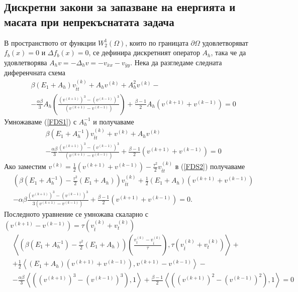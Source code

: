 \documentclass{article}
\newcommand{\rf}[1]{(\ref{#1})}
\theoremstyle{remark}
\begin{document}
\subsection{Дискретни закони за запазване на енергията и масата при непрекъснатата задача}
В пространството от функции $W^1_2(\Omega)$, които по границата $\partial\Omega$ удовлетворяват $f_b(x) = 0$ и $\Delta f_b(x) = 0$, се дефинира дискретният оператор $A_h$, така че да удовлетворява $A_h v=-\Delta_h v=-v_{\bar{x}x} - v_{\bar{y}y}$. Нека да разгледаме следната диференчната схема
\begin{align}\label{FDS1}
&\beta (E_1+A_h)v_{\bar{t}t}^{(k)} + A_hv^{(k)}+A_h^2 v^{(k)} -\nonumber\\
&-\frac{\alpha \beta}{3} A_h\left(\frac{(v^{(k+1)})^3-(v^{(k-1)})^3}{(v^{(k+1)}-v^{(k-1)})} \right) + \frac{\beta - 1}{2}A_h\left( v^{(k+1)}+v^{(k-1)} \right) =0
\end{align}
Умножаваме \rf{FDS1} с $A_h^{-1}$ и получаваме
\begin{align}\label{FDS2}
&\beta (E_1+A_h^{-1})v_{\bar{t}t}^{(k)} + v^{(k)}+A_h v^{(k)} \nonumber\\
&-\frac{\alpha \beta}{3} \frac{(v^{(k+1)})^3-(v^{(k-1)})^3}{(v^{(k+1)}-v^{(k-1)})} + \frac{\beta - 1}{2}\left( v^{(k+1)} + v^{(k-1)} \right)= 0
\end{align}
Ако заместим $v^{(k)}=\frac{1}{2}(v^{(k+1)}+v^{(k-1)})-\frac{\tau^2}{2}v_{\bar{t}t}^{(k)}$ в \rf{FDS2} получаваме
\begin{align*}
&\left( \beta (E_1+A_h^{-1})- \frac{\tau^2}{2}(E_1+A_h ) \right)v_{\bar{t}t}^{(k)}  + \frac{1}{2} (E_1 +A_h )(v^{(k+1)}+v^{(k-1)}) \\
&-\alpha \beta \frac{(v^{(k+1)})^3-(v^{(k-1)})^3}{3(v^{(k+1)}-v^{(k-1)})} + \frac{\beta - 1}{2}\left( v^{(k+1)}+v^{(k-1)} \right) = 0.
\end{align*}
Последното уравнение се умножава скаларно с $(v^{(k+1)}-v^{(k-1)})=\tau (v_{\bar{t}}^{(k)} + v_{t}^{(k)})$
\begin{align*}
&\left< \left( \beta (E_1+A_h^{-1})- \frac{\tau^2}{2}( E_1+A_h ) \right) \left( \frac{v_{t}^{(k)} - v_{\bar t}^{(k)}}{\tau}   \right ), \tau (v_{\bar{t}}^{(k)} + v_{t}^{(k)}) \right>  + \\
& +\frac{1}{2} \left<  (E_1 +A_h ) \left( v^{(k+1)} + v^{(k-1)} \right ) , v^{(k+1)} - v^{(k-1)} \right> - \\
&- \frac{\alpha \beta}{3} \left< \left( (v^{(k+1)})^3-(v^{(k-1)})^3 \right), 1 \right> + \frac{\beta - 1}{2} \left< \left( (v^{(k+1)})^2-(v^{(k-1)})^2 \right), 1 \right> =0
\end{align*}
\end{document}
